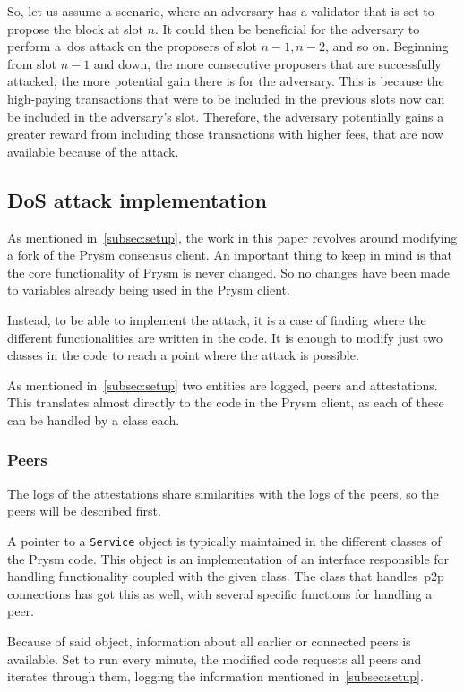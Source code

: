 So, let us assume a scenario, where an adversary has a validator that is set to propose the block at slot $n$.
It could then be beneficial for the adversary to perform a~\gls{dos} attack on the proposers of slot $n-1, n-2$,
and so on.
Beginning from slot $n-1$ and down, the more consecutive proposers that are successfully attacked,
the more potential gain there is for the adversary.
This is
because the high-paying transactions
that were to be included in the previous slots now can be included in the adversary's slot.
Therefore, the adversary potentially gains a greater reward from including those transactions with higher fees,
that are now available because of the attack.

\subsection{DoS attack implementation}\label{subsec:attack-implementation}
As mentioned in~\autoref{subsec:setup},
the work in this paper revolves around modifying a fork of the Prysm consensus client.
An important thing to keep in mind is that the core functionality of Prysm is never changed.
So no changes have been made to variables already being used in the Prysm client.

Instead, to be able to implement the attack,
it is a case of finding where the different functionalities are written in the code.
It is enough to modify just two classes in the code to reach a point where the attack is possible.

As mentioned in~\autoref{subsec:setup} two entities are logged, peers and attestations.
This translates almost directly to the code in the Prysm client, as each of these can be handled by a class each.

\subsubsection{Peers}\label{subsubsec:peers}
The logs of the attestations share similarities with the logs of the peers, so the peers will be described first.

A pointer to a \texttt{Service} object is typically maintained in the different classes of the Prysm code.
This object is an implementation of an interface responsible for handling functionality coupled with the given class.
The class that handles~\gls{p2p} connections has got this as well, with several specific functions for handling a peer.

Because of said object, information about all earlier or connected peers is available.
Set to run every minute, the modified code requests all peers and iterates through them,
logging the information mentioned in~\autoref{subsec:setup}.


